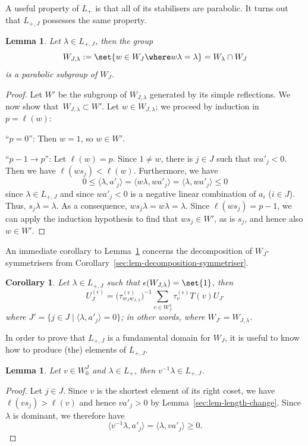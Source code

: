 \documentclass[pdftex]{sigma}
\newtheorem{Lemma}[Theorem]{Lemma}
\newtheorem{Corollary}[Theorem]{Corollary}
\theoremstyle{definition}
\numberwithin{equation}{section}
\begin{document}
A useful property of $L_+$ is that all of its stabilisers are parabolic.
It turns out that $L_{+,J}$ possesses the same property.
\begin{Lemma}\label{sec:lem-J-stabiliser-parabolic}
 Let $\lambda\in L_{+,J}$, then the group
 \[
 W_{J,\lambda} := \set{w\in W_J\where w\lambda=\lambda}
 = W_\lambda\cap W_J
 \]
 is a parabolic subgroup of $W_J$.
\end{Lemma}
\begin{proof}
 Let $W'$ be the subgroup of $W_{J,\lambda}$ generated by its simple reflections. We now show
 that~${W_{J,\lambda}\subset W'}$. Let $w\in W_{J,\lambda}$; we proceed by induction in $p=\ell(w)$:

``$p=0$'': Then $w=1$, so $w\in W'$.

``$p-1\to p$'': Let $\ell(w)=p$. Since $1\ne w$, there is $j\in J$ such that
 $wa'_j<0$. Then we have $\ell(ws_j)<\ell(w)$. Furthermore, we have
 \[
 0 \le \langle \lambda, a'_j\rangle
 = \langle w\lambda, wa'_j\rangle
 = \langle \lambda, wa'_j\rangle \le 0
 \]
 since $\lambda\in L_{+,J}$ and since $wa'_j<0$ is a negative linear combination of
 $a_i$ ($i\in J$). Thus, $s_j\lambda=\lambda$.
 As a consequence, $ws_j\lambda = w\lambda=\lambda$. Since $\ell(ws_j)=p-1$,
 we can apply the induction hypothesis to find that $ws_j\in W'$, as is $s_j$, and
 hence also $w\in W'$.
\end{proof}

An immediate corollary to Lemma~\ref{sec:lem-J-stabiliser-parabolic} concerns the decomposition of
$W_J$-symmetrisers from Corollary~\ref{sec:lem-decomposition-symmetriser}.
\begin{Corollary}\label{sec:cor-decomposition-symmetriser}
 Let $\lambda\in L_{+,J}$ such that $\epsilon(W_{J,\lambda})=\set{1}$, then
 \[
 U^{(\epsilon)}_J = \bigl(\tau^{(\epsilon)}_{w_Jw_{J,\lambda}}\bigr)^{-1}\sum_{v\in W_J^\lambda} \tau^{(\epsilon)}_v
 T(v) U_{J'}
 \]
 where $J'=\{j\in J\mid \langle\lambda,a'_j\rangle=0\}$; in other words, where $W_{J'}=W_{J,\lambda}$.
\end{Corollary}

In order to prove that $L_{+,J}$ is a fundamental domain for $W_J$, it is useful
to know how to produce (the) elements of $L_{+,J}$.
\begin{Lemma}\label{sec:lem-obtain-J-dominant}
 Let $v\in W_0^J$ and $\lambda\in L_+$, then $v^{-1}\lambda\in L_{+,J}$.
\end{Lemma}
\begin{proof}
 Let $j\in J$. Since $v$ is the shortest element of its right coset, we have $\ell(vs_j)>\ell(v)$ and hence
 $va'_j>0$ by Lemma~\ref{sec:lem-length-change}. Since $\lambda$ is dominant, we therefore have
 \[
 \big\langle v^{-1}\lambda, a'_j\big\rangle
 = \langle \lambda, va'_j\rangle\ge0.\tag*{\qed}
 \]\renewcommand{\qed}{}
\end{proof}
\end{document}
